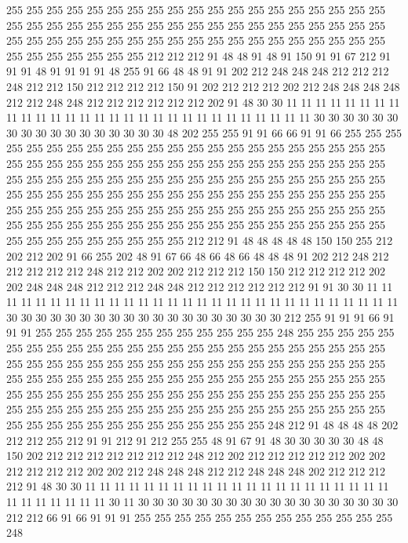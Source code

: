 255 255 255 255 255 255 255 255 255 255 255 255 255 255 255 255 255 255 255 255
255 255 255 255 255 255 255 255 255 255 255 255 255 255 255 255 255 255 255 255
255 255 255 255 255 255 255 255 255 255 255 255 255 255 255 255 255 255 255 255
255 255 255 255 212 212 212 91 48 48 91 48 91 150 91 91 67 212 91 91
91 48 91 91 91 91 48 255 91 66 48 48 91 91 202 212 248 248 248 212
212 212 248 212 212 150 212 212 212 212 150 91 202 212 212 212 202 212 248 248
248 248 212 212 248 248 212 212 212 212 212 212 202 91 48 30 30 11 11 11
11 11 11 11 11 11 11 11 11 11 11 11 11 11 11 11 11 11 11 11
11 11 11 11 11 11 30 30 30 30 30 30 30 30 30 30 30 30 30 30
30 30 30 48 202 255 255 91 91 66 66 91 91 66 255 255 255 255 255 255
255 255 255 255 255 255 255 255 255 255 255 255 255 255 255 255 255 255 255 255
255 255 255 255 255 255 255 255 255 255 255 255 255 255 255 255 255 255 255 255
255 255 255 255 255 255 255 255 255 255 255 255 255 255 255 255 255 255 255 255
255 255 255 255 255 255 255 255 255 255 255 255 255 255 255 255 255 255 255 255
255 255 255 255 255 255 255 255 255 255 255 255 255 255 255 255 255 255 255 255
255 255 255 255 255 255 255 255 255 255 255 255 255 255 255 255 255 255 255 255
212 212 91 48 48 48 48 48 150 150 255 212 202 212 202 91 66 255 202 48
91 67 66 48 66 48 66 48 48 48 91 202 212 248 212 212 212 212 212 248
212 212 202 202 212 212 212 150 150 212 212 212 212 202 202 248 248 248 212 212
212 248 248 212 212 212 212 212 212 91 91 30 30 11 11 11 11 11 11 11
11 11 11 11 11 11 11 11 11 11 11 11 11 11 11 11 11 11 11 11
11 11 30 30 30 30 30 30 30 30 30 30 30 30 30 30 30 30 30 30
30 212 255 91 91 91 66 91 91 91 255 255 255 255 255 255 255 255 255 255
255 255 248 255 255 255 255 255 255 255 255 255 255 255 255 255 255 255 255 255
255 255 255 255 255 255 255 255 255 255 255 255 255 255 255 255 255 255 255 255
255 255 255 255 255 255 255 255 255 255 255 255 255 255 255 255 255 255 255 255
255 255 255 255 255 255 255 255 255 255 255 255 255 255 255 255 255 255 255 255
255 255 255 255 255 255 255 255 255 255 255 255 255 255 255 255 255 255 255 255
255 255 255 255 255 255 255 255 255 255 255 255 255 255 255 255 248 212 91 48
48 48 48 202 212 212 255 212 91 91 212 91 212 255 255 48 91 67 91 48
30 30 30 30 30 48 48 150 202 212 212 212 212 212 212 212 248 212 202 212
212 212 212 212 202 202 212 212 212 212 202 202 212 248 248 248 212 212 248 248
248 202 212 212 212 212 91 48 30 30 11 11 11 11 11 11 11 11 11 11
11 11 11 11 11 11 11 11 11 11 11 11 11 11 11 11 11 11 30 11
30 30 30 30 30 30 30 30 30 30 30 30 30 30 30 30 30 30 212 212
66 91 66 91 91 91 255 255 255 255 255 255 255 255 255 255 255 255 255 248
